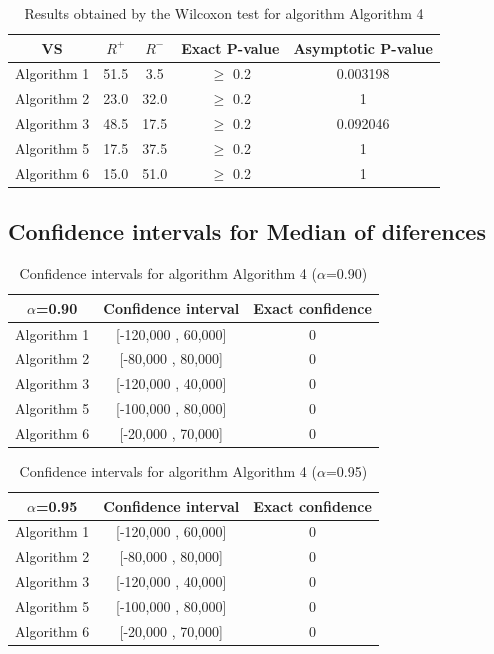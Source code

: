 \documentclass[a4paper,10pt]{article}
\begin{document}
\begin{table}[!htp]
\centering\small
\begin{tabular}{
|c|c|c|c|c|}
\hline
 VS & $R^{+}$ & $R^{-}$ & Exact P-value & Asymptotic P-value \\ \hline 
Algorithm 1 & 51.5 & 3.5 & $\geq$ 0.2 & 0.003198\\ \hline 
Algorithm 2 & 23.0 & 32.0 & $\geq$ 0.2 & 1\\ \hline 
Algorithm 3 & 48.5 & 17.5 & $\geq$ 0.2 & 0.092046\\ \hline 
Algorithm 5 & 17.5 & 37.5 & $\geq$ 0.2 & 1\\ \hline 
Algorithm 6 & 15.0 & 51.0 & $\geq$ 0.2 & 1\\ \hline 

\end{tabular}
\caption{Results obtained by the Wilcoxon test for algorithm Algorithm 4}
\end{table}

\subsection{Confidence intervals for Median of diferences}

\begin{table}[!htp]
\centering\small
\begin{tabular}{
|c|c|c|}
\hline
 $\alpha$=0.90 & Confidence interval & Exact confidence \\ \hline 
Algorithm 1 & [-120,000 , 60,000] & 0\\ \hline 
Algorithm 2 & [-80,000 , 80,000] & 0\\ \hline 
Algorithm 3 & [-120,000 , 40,000] & 0\\ \hline 
Algorithm 5 & [-100,000 , 80,000] & 0\\ \hline 
Algorithm 6 & [-20,000 , 70,000] & 0\\ \hline 

\end{tabular}
\caption{Confidence intervals for algorithm Algorithm 4 ($\alpha$=0.90)}
\end{table}
\begin{table}[!htp]
\centering\small
\begin{tabular}{
|c|c|c|}
\hline
 $\alpha$=0.95 & Confidence interval & Exact confidence \\ \hline 
Algorithm 1 & [-120,000 , 60,000] & 0\\ \hline 
Algorithm 2 & [-80,000 , 80,000] & 0\\ \hline 
Algorithm 3 & [-120,000 , 40,000] & 0\\ \hline 
Algorithm 5 & [-100,000 , 80,000] & 0\\ \hline 
Algorithm 6 & [-20,000 , 70,000] & 0\\ \hline 

\end{tabular}
\caption{Confidence intervals for algorithm Algorithm 4 ($\alpha$=0.95)}
\end{table}
\end{document}
